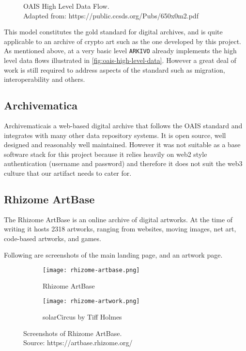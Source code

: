 \begin{figure}[h]
    \centering
    \captionsetup{justification=centering}
    
    \caption[OAIS High Level Data Flow]{OAIS High Level Data Flow. \\ Adapted from: https://public.ccsds.org/Pubs/650x0m2.pdf}
    \label{fig:oais-high-level-data}
\end{figure}

This model constitutes the gold standard for digital archives, and is quite applicable to an archive of crypto art such as the one developed by this project. As mentioned above, at a very basic level \texttt{ARKIVO} already implements the high level data flows illustrated in \autoref{fig:oais-high-level-data}. However a great deal of work is still required to address aspects of the standard such as migration, interoperability and others.

\subsection{Archivematica}

Archivematica\footnotemark[8] is a web-based digital archive that follows the OAIS standard and integrates with many other data repository systems. It is open source, well designed and reasonably well maintained. However it was not suitable as a base software stack for this project because it relies heavily on web2 style authentication (username and password) and therefore it does not suit the web3 culture that our artifact needs to cater for.


\subsection{Rhizome ArtBase}

The Rhizome ArtBase is an online archive of digital artworks. At the time of writing it hosts 2318 artworks, ranging from websites, moving images, net art, code-based artworks, and games.

Following are screenshots of the main landing page, and an artwork page.


\begin{figure}[H]
  \centering
  \captionsetup{justification=centering}
  \begin{subfigure}[b]{0.45\textwidth}
    \centering
    \texttt{[image: rhizome-artbase.png]}
    \caption{Rhizome ArtBase}
    \label{fig:image1}
  \end{subfigure}
  \hfill
  \begin{subfigure}[b]{0.45\textwidth}
    \centering
    \texttt{[image: rhizome-artwork.png]}
    \caption{solarCircus by Tiff Holmes}
    \label{fig:image2}
  \end{subfigure}
  \caption{Screenshots of Rhizome ArtBase. \\ Source: https://artbase.rhizome.org/}
  \label{fig:rhizome-screens}
\end{figure}

